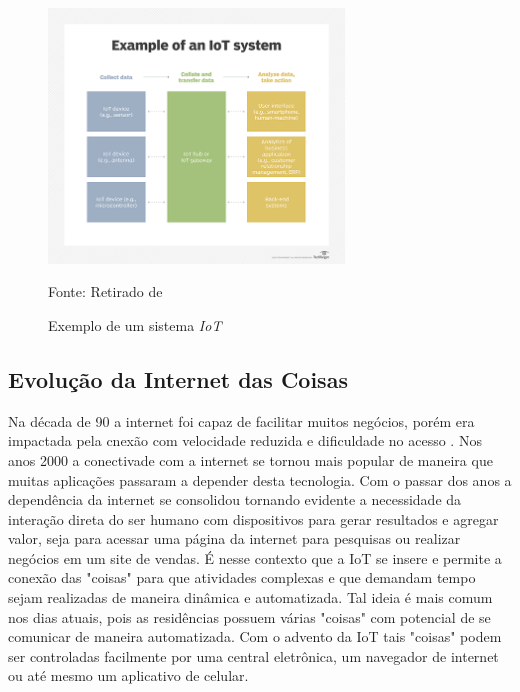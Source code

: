 \documentclass[../../layout.tex]{subfiles}
\begin{document}
\begin{figure}[H]
\centering
\caption{Exemplo de um sistema \emph{IoT}}
\includegraphics[width=0.7\textwidth]{assets/static/img/iot_system.jpg}
\label{fig:i2c}

\begin{minipage}{0.5\textwidth}
\raggedright \footnotesize Fonte: Retirado de  
\end{minipage}
\end{figure}

\subsection{Evolução da Internet das Coisas}
\hspace*{3em}Na década de 90 a internet foi capaz de facilitar muitos negócios, porém era impactada pela cnexão com velocidade reduzida  e dificuldade no acesso \cite{iot_evolution}. Nos anos 2000 a conectivade com a internet se tornou mais popular de maneira que muitas aplicações passaram a depender desta tecnologia. Com o passar dos anos a dependência da internet se consolidou tornando evidente a necessidade da interação direta do ser humano com dispositivos para gerar resultados e agregar valor, seja para acessar uma página da internet para pesquisas ou realizar negócios em um site de vendas. É nesse contexto que a IoT se insere e permite a conexão das "coisas" para que atividades complexas e que demandam tempo sejam realizadas de maneira dinâmica e automatizada. Tal ideia é mais comum nos dias atuais, pois as residências possuem várias "coisas" com potencial de se comunicar de maneira automatizada. Com o advento da IoT tais "coisas" podem ser controladas facilmente por uma central eletrônica, um navegador de internet ou até mesmo um aplicativo de celular.
\end{document}
